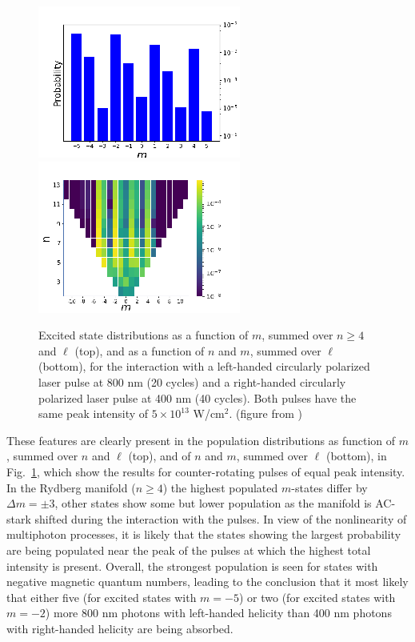 \begin{figure}[!ht]
\centering
\includegraphics[width=0.49\columnwidth]{figs/Rydberg/Gebre-bicircular-Fig8a.png}
\includegraphics[width=0.49\columnwidth]{figs/Rydberg/Gebre-bicircular-Fig8b.png}
\caption{\label{fig:nm-counter-distribution}
Excited state distributions as a function of $m$, summed over $n \ge 4$ and $\ell$ (top), and as a function of $n$ and $m$, summed over $\ell$ (bottom), for the interaction with a left-handed circularly polarized laser pulse at 800 nm (20 cycles) and a right-handed circularly polarized laser pulse at 400 nm (40 cycles). Both pulses have the same peak intensity of $5 \times 10^{13}$ W/cm$^2$. (figure from \cite{venzke2020_ryd})
}
\end{figure}

These features are clearly present in the population distributions as function of $m$, summed over $n$ and $\ell$ (top), and of $n$ and $m$, summed over $\ell$ (bottom), in Fig.\ \ref{fig:nm-counter-distribution}, which show the results for counter-rotating pulses of equal peak intensity. In the Rydberg manifold ($n \ge 4$) the highest populated $m$-states differ by $\Delta m = \pm 3$, other states show some but lower population as the manifold is AC-stark shifted during the interaction with the pulses. In view of the nonlinearity of multiphoton processes, it is likely that the states showing the largest probability are being populated near the peak of the pulses at which the highest total intensity is present. Overall, the strongest population is seen for states with negative magnetic quantum numbers, leading to the conclusion that it most likely that either five (for excited states with $m = -5$) or two (for excited states with $m = -2$) more 800 nm photons with left-handed helicity than 400 nm photons with right-handed helicity are being absorbed.    



